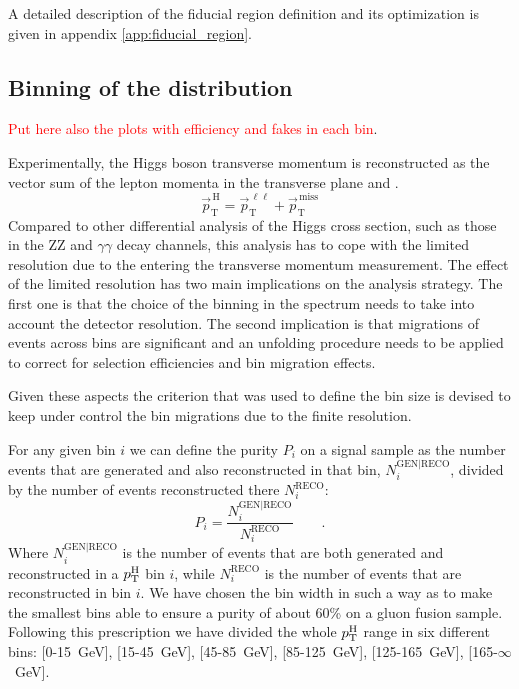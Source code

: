 A detailed description of the fiducial region definition and its optimization is given in appendix \ref{app:fiducial_region}.

\subsection{Binning of the \pth distribution}

\textcolor{red}{Put here also the plots with efficiency and fakes in each \pth bin}.

Experimentally, the Higgs boson transverse momentum is reconstructed as the vector sum of the lepton momenta in the transverse plane and \MET.
\begin{equation}
\vec{p}_\mathrm{T}^\mathrm{\,H} = \vec{p}_\mathrm{T}^{\,\ell\ell} + \vec{p}_\mathrm{T}^\mathrm{\,miss}
\end{equation}
Compared to other differential analysis of the Higgs cross section, such as those in the ZZ and $\gamma\gamma$ decay channels, this analysis has to cope with the limited resolution due to the \MET entering the transverse momentum measurement.
The effect of the limited \MET resolution has two main implications on the analysis strategy.
The first one is that the choice of the binning in the \pth{} spectrum needs to take into account the detector resolution.
The second implication is that migrations of events across bins are significant and an unfolding procedure needs to be applied to correct for selection efficiencies and bin migration effects.

Given these aspects the criterion that was used to define the \pth bin size is devised to keep under control the bin migrations due to the finite resolution.

For any given bin $i$ we can define the purity $P_i$ on a signal sample as the number events that are generated and also reconstructed in that bin, $N_i^\mathrm{GEN|RECO}$, divided by the number of events reconstructed there $N_i^\mathrm{RECO}$:
\begin{equation}
P_i = \frac{N_i^\mathrm{GEN|RECO}}{N_i^\mathrm{RECO}} \qquad .
\end{equation}
Where $N_i^\mathrm{GEN|RECO}$ is the number of events that are both generated and
reconstructed in a $p_\mathrm{T}^\mathrm{H}$ bin $i$, while $N_i^\mathrm{RECO}$ is the number of events
that are reconstructed in bin $i$. We have chosen the bin width in such a way
as to make the smallest bins able to ensure a purity of about 60\% on a gluon fusion sample.
Following this prescription we have divided the whole $p_\mathrm{T}^\mathrm{H}$ range in six
different bins: \mbox{[0-15 GeV]}, \mbox{[15-45 GeV]}, \mbox{[45-85 GeV]},
\mbox{[85-125 GeV]}, \mbox{[125-165 GeV]}, \mbox{[165-$\infty$ GeV]}.


